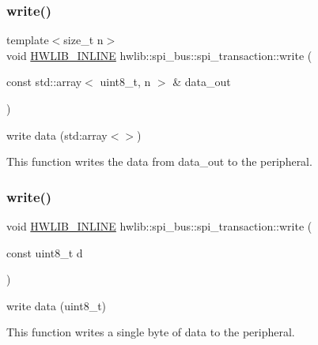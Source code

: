 \subsubsection{\texorpdfstring{write()}{write()}\hspace{0.1cm}{\footnotesize\ttfamily [2/3]}}
{\footnotesize\ttfamily template$<$size\+\_\+t n$>$ \\
void \hyperlink{hwlib-defines_8hpp_a520a8905adc71f1757aea4ce05183585}{H\+W\+L\+I\+B\+\_\+\+I\+N\+L\+I\+NE} hwlib\+::spi\+\_\+bus\+::spi\+\_\+transaction\+::write (\begin{DoxyParamCaption}\item[{const std\+::array$<$ uint8\+\_\+t, n $>$ \&}]{data\+\_\+out }\end{DoxyParamCaption})\hspace{0.3cm}{\ttfamily [inline]}}

write data (std\+:array$<$$>$)

This function writes the data from data\+\_\+out to the peripheral. \mbox{\label{classhwlib_1_1spi__bus_1_1spi__transaction_a5a9e7385743ee94b8316f602c7050044}} 
\subsubsection{\texorpdfstring{write()}{write()}\hspace{0.1cm}{\footnotesize\ttfamily [3/3]}}
{\footnotesize\ttfamily void \hyperlink{hwlib-defines_8hpp_a520a8905adc71f1757aea4ce05183585}{H\+W\+L\+I\+B\+\_\+\+I\+N\+L\+I\+NE} hwlib\+::spi\+\_\+bus\+::spi\+\_\+transaction\+::write (\begin{DoxyParamCaption}\item[{const uint8\+\_\+t}]{d }\end{DoxyParamCaption})\hspace{0.3cm}{\ttfamily [inline]}}

write data (uint8\+\_\+t)

This function writes a single byte of data to the peripheral. \mbox{\label{classhwlib_1_1spi__bus_1_1spi__transaction_a4ee28fb69390f3e7bd6f70288e602227}} 
